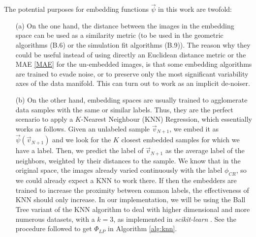 \documentclass[11pt, a4paper, twoside]{article} %
\begin{document}
The potential purposes for embedding functions $\vec{\psi}$ in this work are twofold:\vspace{-0.25cm}
\begin{itemize}
\item[(a)] On the one hand, the distance between the images in the embedding space can be used as a similarity metric (to be used in the geometric algorithms (B.6) or the simulation fit algorithms (B.9)). The reason why they could be useful instead of using directly an Euclidean distance metric or the MAE \eqref{MAE} for the un-embedded images, is that some embedding algorithms are trained to evade noise, or to preserve only the most significant variability axes of the data manifold. This can turn out to work as an implicit de-noiser.\vspace{-0.1cm}

\item[(b)] On the other hand, embedding spaces are usually trained to agglomerate data samples with the same or similar labels. Thus, they are the perfect scenario to apply a $K$-Nearest Neighbour (KNN) Regression, which essentially works as follows. Given an unlabeled sample $\vec{v}_{N+1}$, we embed it as $\vec{\psi}(\vec{v}_{N+1})$ and we look for the $K$ closest embedded samples for which we have a label. Then, we predict the label of $\vec{v}_{N+1}$ as the average label of the neighbors, weighted by their distances to the sample. We know that in the original space, the images already varied continuously with the label $\phi_{CR}$, so we could already expect a KNN to work there. If then the embedders are trained to increase the proximity between common labels, the effectiveness of KNN should only increase. In our implementation, we will be using the Ball Tree \cite{balltree} variant of the KNN algorithm to deal with higher dimensional and more numerous datasets, with a $k=3$, as implemented in {\em scikit-learn} \cite{sklearn}. See the procedure followed to get $\Phi_{LP}$ in Algorithm \ref{alg:knn}.\vspace{-0.25cm}
\end{itemize}
\end{document}

